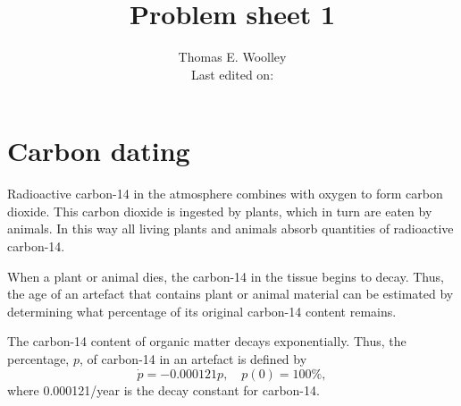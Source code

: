 \documentclass[10pt]{article}
\newcommand{\bb}{\begin{equation}}
\newcommand{\ee}{\end{equation}}
\begin{document}


\title{Problem sheet 1}
\author{Thomas E. Woolley\\Last edited on:}
\maketitle
\section{Carbon dating}

Radioactive carbon-14 in the atmosphere combines with oxygen to form carbon dioxide. This carbon dioxide is ingested by plants, which in turn are eaten by animals. In
this way all living plants and animals absorb quantities of radioactive carbon-14.

When a plant or animal dies, the carbon-14 in the tissue begins to decay. Thus, the age of an artefact that contains plant or animal material can be estimated by determining what percentage of its original carbon-14 content remains.

The carbon-14 content of organic matter decays exponentially. Thus, the percentage, $p$, of carbon-14 in an artefact is defined by
\bb
\dot{p}=-0.000121p,\quad p(0)=100\%,\label{Carbon_decay}
\ee
where 0.000121/year is the decay constant for carbon-14.
\end{document}
